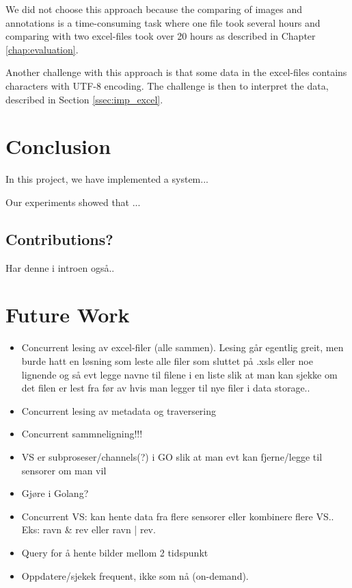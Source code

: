 \documentclass[USenglish]{uit-thesis}
\begin{document}
We did not choose this approach because the comparing of images and annotations is a time-consuming task where one file took several hours and comparing with two excel-files took over 20 hours as described in Chapter \ref{chap:evaluation}.

Another challenge with this approach is that some data in the excel-files contains characters with UTF-8 encoding. The challenge is then to interpret the data, described in Section \ref{ssec:imp_excel}.





\chapter{Conclusion}
In this project, we have implemented a system...

Our experiments showed that ...

\section{Contributions?}
Har denne i introen også..

\chapter{Future Work}
\begin{itemize}
\item Concurrent lesing av excel-filer (alle sammen). Lesing går egentlig greit, men burde hatt en løsning som leste alle filer som sluttet på .xsls eller noe lignende og så evt legge navne til filene i en liste slik at man kan sjekke om det filen er lest fra før av hvis man legger til nye filer i data storage..
\item Concurrent lesing av metadata og traversering
\item Concurrent sammneligning!!!
\item VS er subproseser/channels(?) i GO slik at man evt kan fjerne/legge til sensorer om man vil
\item Gjøre i Golang?
\item Concurrent VS: kan hente data fra flere sensorer eller kombinere flere VS.. Eks: ravn \& rev eller ravn | rev.
\item Query for å hente bilder mellom 2 tidspunkt
\item Oppdatere/sjekek frequent, ikke som nå (on-demand).
\end{itemize}
\end{document}
